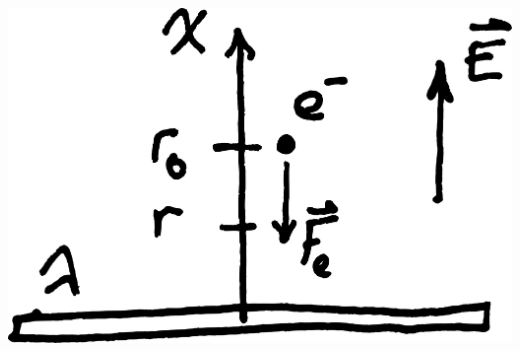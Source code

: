 \begin{center}
  \includegraphics[scale=0.04]{04-potentiel/figures/exercice-tige-energie-potentielle.pdf}
\end{center}
